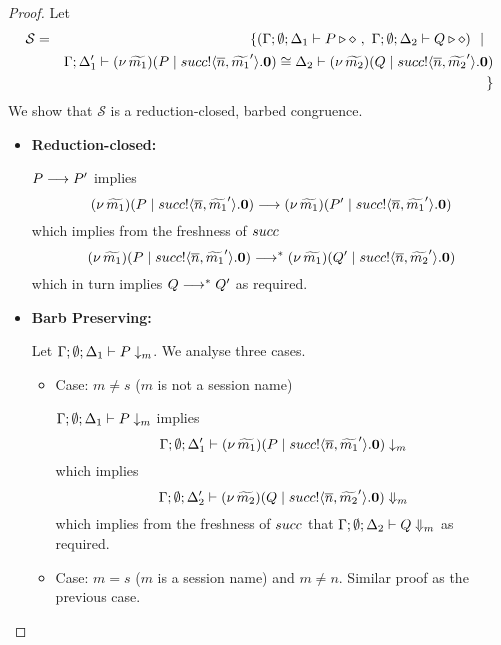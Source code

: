 \begin{proof}
	\noi Let
%
	\begin{eqnarray*}
		\mathcal{S}	&=&
					\{(\Gamma; \emptyset; \Delta_1 \vdash P \triangleright \diamond\ ,\ \Gamma; \emptyset; \Delta_2 \vdash Q \triangleright \diamond) \ \ |\ \  \\
				& &	\Gamma; \Delta_1' \vdash (\nu\, \widetilde{m_1})(P \;|\; succ ! \langle \overline{n}, \widetilde{m_1}' \rangle . \mathbf{0}) \cong \Delta_2 \vdash (\nu\, \widetilde{m_2})(Q \;|\; succ ! \langle \overline{n}, \widetilde{m_2}' \rangle . \mathbf{0}) \\
		&&\}
	\end{eqnarray*}
%
	\noi We show that $\mathcal{S}$ is a reduction-closed, barbed congruence.


	\begin{itemize}
		\item	{\bf Reduction-closed:}

				$P \longrightarrow P'$
				implies
				\[
					(\nu\, \widetilde{m_1})(P \;|\; succ ! \langle \overline{n}, \widetilde{m_1}' \rangle . \mathbf{0})
					\longrightarrow
					(\nu\, \widetilde{m_1})(P' \;|\; succ ! \langle \overline{n}, \widetilde{m_1}' \rangle . \mathbf{0})
				\]
				which implies from the freshness of $succ$
				\[
					(\nu\, \widetilde{m_1})(P \;|\; succ ! \langle \overline{n}, \widetilde{m_1}' \rangle . \mathbf{0})
					\longrightarrow^{*}
					(\nu\, \widetilde{m_1})(Q' \;|\; succ ! \langle \overline{n}, \widetilde{m_2}' \rangle . \mathbf{0})
				\]
				which in turn implies
				$Q \longrightarrow^{*} Q'$ as required.

	\item	{\bf Barb Preserving:}

			Let $\Gamma; \emptyset; \Delta_1 \vdash P \downarrow_{m}$. We analyse three cases.
		    \begin{itemize}
				\item	Case: $m \not= s$ ($m$ is not a session name)

						$\Gamma; \emptyset; \Delta_1 \vdash P \downarrow_{m}$
						implies
						\[
							\Gamma; \emptyset; \Delta_1' \vdash
							(\nu\, \widetilde{m_1})(P \;|\; succ ! \langle \overline{n}, \widetilde{m_1}' \rangle . \mathbf{0})
							\downarrow_{m}
						\]
						which implies
						\[
							\Gamma; \emptyset; \Delta_2' \vdash
							(\nu\, \widetilde{m_2})(Q \;|\; succ ! \langle \overline{n}, \widetilde{m_2}' \rangle . \mathbf{0})
							\Downarrow_{m}
						\]
						which implies from the freshness of $succ$ that
						$\Gamma; \emptyset; \Delta_2 \vdash Q \Downarrow_{m}$ as required.

				\item	Case: $m = s$ ($m$ is a session name) and $m \not= n$.
						Similar proof as the previous case.


\end{itemize}
\end{itemize}
\end{proof}
